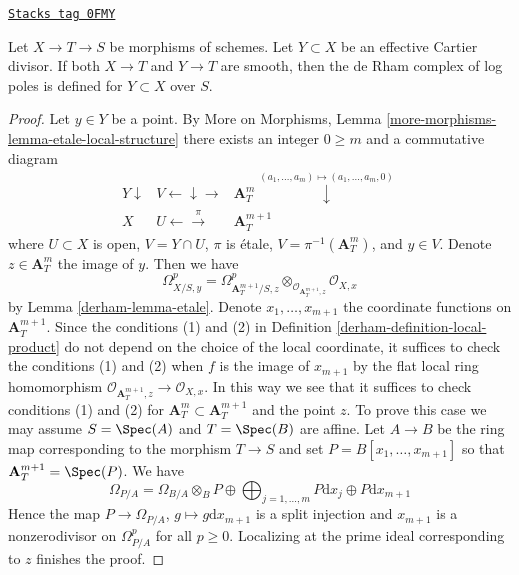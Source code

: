 \begin{lemma}
\label{derham-lemma-check-log-smooth}
\href{https://stacks.math.columbia.edu/tag/0FMY}{\texttt{Stacks tag 0FMY}}

Let $X \to T \to S$ be morphisms of schemes. Let $Y \subset X$ be an effective
Cartier divisor. If both $X \to T$ and $Y \to T$ are smooth, then
the de Rham complex of log poles is defined for $Y \subset X$ over $S$.
\end{lemma}

\begin{proof}

Let $y \in Y$ be a point.
By More on Morphisms, Lemma \ref{more-morphisms-lemma-etale-local-structure}
there exists an integer $0 \geq m$ and a commutative diagram
$$
\begin{array}{ccc}Y \downarrow & V \longleftarrow\downarrow\longrightarrow & \mathbf{A}^m_T
\overset{(a_1, \ldots, a_m) \mapsto (a_1, \ldots, a_m, 0)}{\downarrow} \\ X & U \longleftarrow\overset{\pi}{\longrightarrow} & \mathbf{A}^{m + 1}_T\end{array}
$$
where $U \subset X$ is open, $V = Y \cap U$,
$\pi$ is \'etale, $V = \pi^{-1}(\mathbf{A}^m_T)$, and $y \in V$.
Denote $z \in \mathbf{A}^m_T$ the image of $y$. Then we have
$$
\Omega^p_{X/S, y} = \Omega^p_{\mathbf{A}^{m + 1}_T/S, z}
\otimes_{\mathcal{O}_{\mathbf{A}^{m + 1}_T, z}} \mathcal{O}_{X, x}
$$
by Lemma \ref{derham-lemma-etale}. Denote $x_1, \ldots, x_{m + 1}$
the coordinate functions on $\mathbf{A}^{m + 1}_T$.
Since the conditions (1) and (2) in Definition \ref{derham-definition-local-product}
do not depend on the choice of the local coordinate,
it suffices to check the conditions (1) and (2) when $f$ is the
image of $x_{m + 1}$ by the flat local ring homomorphism
$\mathcal{O}_{\mathbf{A}^{m + 1}_T, z} \to \mathcal{O}_{X, x}$.
In this way we see that it suffices to check conditions (1) and (2)
for $\mathbf{A}^m_T \subset \mathbf{A}^{m + 1}_T$ and the point $z$.
To prove this case we may assume $S = \Spec(A)$ and $T = \Spec(B)$
are affine. Let $A \to B$ be the ring map corresponding to the morphism
$T \to S$ and set $P = B[x_1, \ldots, x_{m + 1}]$ so that
$\mathbf{A}^{m + 1}_T = \Spec(P)$. We have
$$
\Omega_{P/A} = \Omega_{B/A} \otimes_B P \oplus
\bigoplus\nolimits_{j = 1, \ldots, m} P \text{d}x_j \oplus
P \text{d}x_{m + 1}
$$
Hence the map $P \to \Omega_{P/A}$, $g \mapsto g \text{d}x_{m + 1}$
is a split injection and $x_{m + 1}$ is a nonzerodivisor on
$\Omega^p_{P/A}$ for all $p \geq 0$. Localizing at the prime ideal
corresponding to $z$ finishes the proof.
\end{proof}


